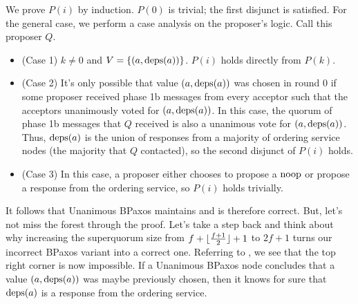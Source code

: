 We prove $P(i)$ by induction. $P(0)$ is trivial; the first disjunct is
satisfied. For the general case, we perform a case analysis on the proposer's
logic. Call this proposer $Q$.
\begin{itemize}
  \item (Case 1)
    $k \neq 0$ and $V = \{(a, \text{deps}(a))\}$. $P(i)$ holds directly from
    $P(k)$.

  \item (Case 2)
    It's only possible that value $(a, \text{deps}(a))$ was chosen in round $0$ if
    some proposer received phase 1b messages from every acceptor such that the
    acceptors unanimously voted for $(a, \text{deps}(a))$.
    In this case, the quorum of phase 1b messages that $Q$ received is also a
    unanimous vote for $(a, \text{deps}(a))$.  Thus, $\text{deps}(a)$ is the union of
    responses from a majority of ordering service nodes (the majority that $Q$
    contacted), so the second disjunct of $P(i)$ holds.

  \item (Case 3)
    In this case, a proposer either chooses to propose a $\text{noop}$ or propose a
    response from the ordering service, so $P(i)$ holds trivially.
\end{itemize}

It follows that Unanimous BPaxos maintains  and is
therefore correct. But, let's not miss the forest through the proof. Let's take
a step back and think about why increasing the superquorum size from $f +
\lfloor\frac{f+1}{2}\rfloor + 1$ to $2f+1$ turns our incorrect BPaxos variant into a
correct one. Referring to , we see that the top right
corner is now impossible. If a Unanimous BPaxos node concludes that a value
$(a, \text{deps}(a))$ was maybe previously chosen, then it knows for sure that
$\text{deps}(a)$ is a response from the ordering service.
